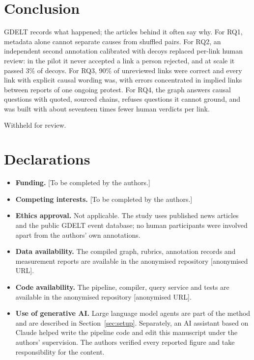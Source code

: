 \documentclass[pdflatex,sn-basic,lineno]{sn-jnl}
\theoremstyle{thmstylethree}
\theoremstyle{thmstyleone}
\begin{document}
\section{Conclusion}\label{sec:conclusion}

GDELT records what happened; the articles behind it often say why. For RQ1, metadata alone
cannot separate causes from shuffled pairs. For RQ2, an independent second annotation calibrated
with decoys replaced per-link human review: in the pilot it never accepted a link a person
rejected, and at scale it passed 3\% of decoys. For RQ3, 90\% of unreviewed links were correct and
every link with explicit causal wording was, with errors concentrated in implied links between
reports of one ongoing protest. For RQ4, the graph answers causal questions with quoted, sourced
chains, refuses questions it cannot ground, and was built with about seventeen times fewer human
verdicts per link.

\backmatter

Withheld for review.

\section*{Declarations}

\begin{itemize}
\item \textbf{Funding.} [To be completed by the authors.]
\item \textbf{Competing interests.} [To be completed by the authors.]
\item \textbf{Ethics approval.} Not applicable. The study uses published news articles and the
public GDELT event database; no human participants were involved apart from the authors' own
annotations.
\item \textbf{Data availability.} The compiled graph, rubrics, annotation records and measurement
reports are available in the anonymised repository [anonymised URL].
\item \textbf{Code availability.} The pipeline, compiler, query service and tests are available in
the anonymised repository [anonymised URL].
\item \textbf{Use of generative AI.} Large language model agents are part of the method and are
described in Section~\ref{sec:setup}. Separately, an AI assistant based on Claude helped write the
pipeline code and edit this manuscript under the authors' supervision. The authors verified every
reported figure and take responsibility for the content.
\end{itemize}


\end{document}
